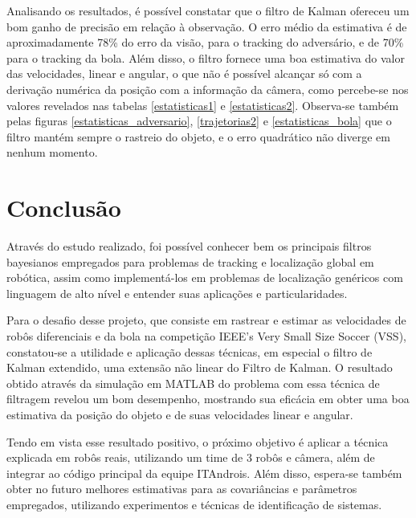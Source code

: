 \documentclass[paper=a4, fontsize=11pt]{scrartcl}
\begin{document}
Analisando os resultados, é possível constatar que o filtro de Kalman ofereceu um bom ganho de precisão em relação à observação. O erro médio da estimativa é de aproximadamente 78\% do erro da visão, para o tracking do adversário, e de 70\% para o tracking da bola. Além disso, o filtro fornece uma boa estimativa do valor das velocidades, linear e angular, o que não é possível alcançar só com a derivação numérica da posição com a informação da câmera, como percebe-se nos valores revelados nas tabelas \ref{estatisticas1} e \ref{estatisticas2}. Observa-se também pelas figuras \ref{estatisticas_adversario}, \ref{trajetorias2} e \ref{estatisticas_bola} que o filtro mantém sempre o rastreio do objeto, e o erro quadrático não diverge em nenhum momento.

\section{Conclusão}

Através do estudo realizado, foi possível conhecer bem os principais filtros bayesianos empregados para problemas de tracking e localização global em robótica, assim como implementá-los em problemas de localização genéricos com linguagem de alto nível e entender suas aplicações e particularidades.

Para o desafio desse projeto, que consiste em rastrear e estimar as velocidades de robôs diferenciais e da bola na competição IEEE’s Very Small Size Soccer (VSS), constatou-se a utilidade e aplicação dessas técnicas, em especial o filtro de Kalman extendido, uma extensão não linear do Filtro de Kalman. O resultado obtido através da simulação em MATLAB do problema com essa técnica de filtragem revelou um bom desempenho, mostrando sua eficácia em obter uma boa estimativa da posição do objeto e de suas velocidades linear e angular.

Tendo em vista esse resultado positivo, o próximo objetivo é aplicar a técnica explicada em robôs reais, utilizando um time de 3 robôs e câmera, além de integrar ao código principal da equipe ITAndrois. Além disso, espera-se também obter no futuro melhores estimativas para as covariâncias e parâmetros empregados, utilizando experimentos e técnicas de identificação de sistemas.
\end{document}
